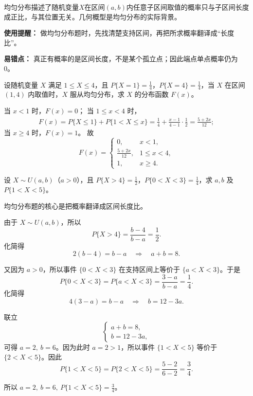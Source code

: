 ﻿\documentclass[lang=cn,11pt]{elegantbook}
\begin{document}
\begin{note}
均匀分布描述了随机变量$X$在区间$(a,b)$内任意子区间取值的概率只与子区间长度成正比，与其位置无关。几何概型是均匀分布的实际背景。

\textbf{使用提醒：} 做均匀分布题时，先找清楚支持区间，再把所求概率翻译成“长度比”。

\textbf{易错点：} 真正有概率的是区间长度，不是某个孤立点；因此端点单点概率仍为 0。
\end{note}

\begin{exercise}\label{exer:2-13}
设随机变量 $X$ 满足 $1 \le X \le 4$，且 $P\{X=1\} = \frac{1}{4}$，$P\{X=4\} = \frac{1}{4}$，当 $X$ 在区间 $(1,4)$ 内取值时，$X$ 服从均匀分布，求 $X$ 的分布函数 $F(x)$。
\end{exercise}
\begin{solution}
当 $x < 1$ 时，$F(x) = 0$；
当 $1 \le x < 4$ 时，
\[
\begin{aligned}
F(x) = P\{X \le 1\} + P\{1 < X \le x\} = \frac{1}{4} + \frac{x-1}{4-1} \cdot \frac{1}{2} = \frac{5 + 2x}{12};
\end{aligned}
\]
当 $x \ge 4$ 时，$F(x) = 1$。
故
\[
F(x) = \begin{cases}
0, & x < 1, \\
\frac{5 + 2x}{12}, & 1 \le x < 4, \\
1, & x \ge 4.
\end{cases}
\]
\end{solution}

\begin{exercise}\label{exer:2-16}
设 $X \sim U(a,b)$（$a>0$），且 $P\{X>4\} = \frac{1}{2}$，$P\{0<X<3\} = \frac{1}{4}$，求 $a,b$ 及 $P\{1<X<5\}$。
\end{exercise}
\begin{solution}
均匀分布题的核心是把概率翻译成区间长度比。

由于 \(X\sim U(a,b)\)，所以
\[
P\{X>4\}=\frac{b-4}{b-a}=\frac12.
\]
化简得
\[
2(b-4)=b-a \quad \Longrightarrow \quad a+b=8.
\]

又因为 \(a>0\)，所以事件 \(\{0<X<3\}\) 在支持区间上等价于 \(\{a<X<3\}\)。于是
\[
P\{0<X<3\}=P\{a<X<3\}=\frac{3-a}{b-a}=\frac14.
\]
化简得
\[
4(3-a)=b-a \quad \Longrightarrow \quad b=12-3a.
\]

联立
\[
\begin{cases}
a+b=8,\\
b=12-3a,
\end{cases}
\]
可得 \(a=2,\ b=6\)。因为此时 \(a=2>1\)，所以事件 \(\{1<X<5\}\) 等价于 \(\{2<X<5\}\)。因此
\[
P\{1<X<5\}=P\{2<X<5\}=\frac{5-2}{6-2}=\frac34.
\]

所以 \(a=2,\ b=6,\ P\{1<X<5\}=\frac34\)。
\end{solution}
\end{document}
